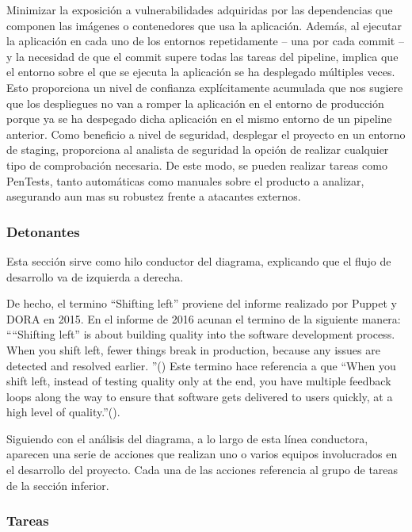 \documentclass[12pt]{report} %
\begin{document}
Minimizar la exposición a vulnerabilidades adquiridas por las dependencias que
componen las imágenes o contenedores que usa la aplicación.
Además, al ejecutar la aplicación en cada uno de los entornos repetidamente --
una por cada \gls{commit} -- y la necesidad de que el \gls{commit} supere todas
las tareas del \gls{pipeline}, implica que el entorno sobre el que se ejecuta la
aplicación se ha desplegado múltiples veces.  Esto proporciona un nivel de
confianza explícitamente acumulada que nos sugiere que los despliegues no van a
romper la aplicación en el entorno de producción porque ya se ha despegado dicha
aplicación en el mismo entorno de un \gls{pipeline} anterior.  Como beneficio a
nivel de seguridad, desplegar el proyecto en un entorno de staging, proporciona
al analista de seguridad la opción de realizar cualquier tipo de comprobación
necesaria.  De este modo, se pueden realizar tareas como \gls{PenTest}s, tanto
automáticas como manuales sobre el producto a analizar, asegurando aun mas su
robustez frente a atacantes externos.

\subsubsection{Detonantes}
 
Esta sección sirve como hilo conductor del diagrama, explicando que el flujo de
desarrollo va de izquierda a derecha.

De hecho, el termino ``Shifting left'' proviene del informe realizado por Puppet
y DORA en 2015. En el informe de 2016 acunan el termino de la siguiente manera:
``“Shifting left” is about building quality  into the software development
process. When you shift left, fewer things break in production, because any
issues are detected and resolved earlier. ''(\cite{SODO2016})
Este termino hace referencia a que ``When you shift left, instead of testing
quality only at the end, you have multiple feedback loops along the way to
ensure that software gets delivered to users quickly, at a high level of
quality.''(\cite{SODO2016}).

Siguiendo con el análisis del diagrama, a lo largo de esta línea conductora,
aparecen una serie de acciones que realizan uno o varios equipos involucrados en
el desarrollo del proyecto.
Cada una de las acciones referencia al grupo de tareas de la sección inferior.

\subsubsection{Tareas}
\end{document}
